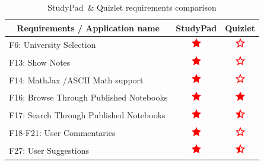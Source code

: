 \documentclass[thesis=B,english]{FITthesis}[2012/10/20]
\newcommand{\appname}{StudyPad}
\newcommand{\present}{\begin{minipage}{.1\textwidth}
\centering
      \includegraphics[width=15pt, height=15pt]{ic_star_black_24dp}
    \end{minipage}}
\newcommand{\limited}{\begin{minipage}{.1\textwidth}
\centering
      \includegraphics[width=15pt, height=15pt]{ic_star_half_black_24dp}
    \end{minipage}}
\newcommand{\absent}{\begin{minipage}{.1\textwidth}
\centering
      \includegraphics[width=15pt, height=15pt]{ic_star_border_black_24dp}
    \end{minipage}}
\begin{document}
\begin{table}[H]
\caption{\appname\ \& Quizlet requirements comparison}
\label{tab:quizlet}
\begin{tabular}{|l|c|c|}
\hline
\multicolumn{1}{|c|}{\textbf{Requirements / Application name}} & \multicolumn{1}{l|}{\textbf{StudyPad}} & \multicolumn{1}{l|}{\textbf{Quizlet}} \\ \hline
F6: University Selection                                       & \present                                & \absent                                \\ \hline
F13: Show Notes                                                & \present                                                                & \absent                                \\ \hline
F14: MathJax /ASCII Math support                               & \present                                                                & \absent                                \\ \hline
F16: Browse Through Published Notebooks                        & \present                                                                & \present                               \\ \hline
F17: Search Through Published Notebooks                    & \present                                                                & \limited                               \\ \hline
F18-F21: User Commentaries                                     & \present                                                                & \absent                                \\ \hline
F27: User Suggestions                                          & \present                                                                & \limited                               \\ \hline
\end{tabular}
\end{table}
\end{document}
